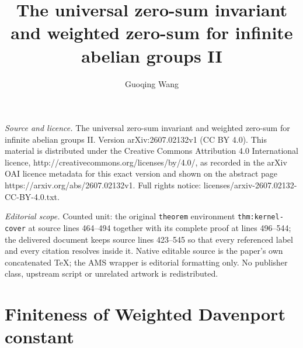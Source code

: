 \documentclass[10pt,a4paper]{amsart}
\begin{document}
\title[The universal zero-sum invariant and weighted zero-sum for i]{The universal zero-sum invariant and weighted zero-sum for infinite abelian groups II}
\author{Guoqing Wang}
\date{}
\maketitle
\noindent\emph{Source and licence.} The universal zero-sum invariant and weighted zero-sum for infinite abelian groups II. Version arXiv:2607.02132v1 (CC BY 4.0). This material is distributed under the Creative Commons Attribution 4.0 International licence, http://creativecommons.org/licenses/by/4.0/, as recorded in the arXiv OAI licence metadata for this exact version and shown on the abstract page https://arxiv.org/abs/2607.02132v1. Full rights notice: licenses/arxiv-2607.02132-CC-BY-4.0.txt.\par\smallskip
\noindent\textit{Editorial scope.} Counted unit: the original \texttt{theorem} environment \texttt{thm:kernel-cover} at source lines 464--494 together with its complete proof at lines 496--544; the delivered document keeps source lines 423--545 so that every referenced label and every citation resolves inside it. Native editable source is the paper's own concatenated TeX; the AMS wrapper is editorial formatting only. No publisher class, upstream script or unrelated artwork is redistributed.
\section{Finiteness of Weighted Davenport constant}
\end{document}
